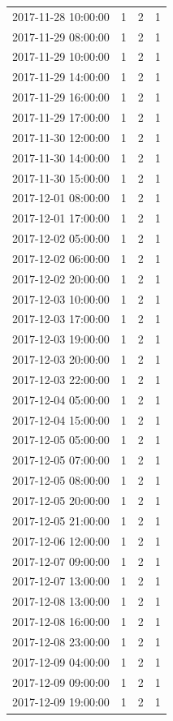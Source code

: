\begin{tabular}{lrrr}
2017-11-28 10:00:00 & 1 & 2 & 1 \\
2017-11-29 08:00:00 & 1 & 2 & 1 \\
2017-11-29 10:00:00 & 1 & 2 & 1 \\
2017-11-29 14:00:00 & 1 & 2 & 1 \\
2017-11-29 16:00:00 & 1 & 2 & 1 \\
2017-11-29 17:00:00 & 1 & 2 & 1 \\
2017-11-30 12:00:00 & 1 & 2 & 1 \\
2017-11-30 14:00:00 & 1 & 2 & 1 \\
2017-11-30 15:00:00 & 1 & 2 & 1 \\
2017-12-01 08:00:00 & 1 & 2 & 1 \\
2017-12-01 17:00:00 & 1 & 2 & 1 \\
2017-12-02 05:00:00 & 1 & 2 & 1 \\
2017-12-02 06:00:00 & 1 & 2 & 1 \\
2017-12-02 20:00:00 & 1 & 2 & 1 \\
2017-12-03 10:00:00 & 1 & 2 & 1 \\
2017-12-03 17:00:00 & 1 & 2 & 1 \\
2017-12-03 19:00:00 & 1 & 2 & 1 \\
2017-12-03 20:00:00 & 1 & 2 & 1 \\
2017-12-03 22:00:00 & 1 & 2 & 1 \\
2017-12-04 05:00:00 & 1 & 2 & 1 \\
2017-12-04 15:00:00 & 1 & 2 & 1 \\
2017-12-05 05:00:00 & 1 & 2 & 1 \\
2017-12-05 07:00:00 & 1 & 2 & 1 \\
2017-12-05 08:00:00 & 1 & 2 & 1 \\
2017-12-05 20:00:00 & 1 & 2 & 1 \\
2017-12-05 21:00:00 & 1 & 2 & 1 \\
2017-12-06 12:00:00 & 1 & 2 & 1 \\
2017-12-07 09:00:00 & 1 & 2 & 1 \\
2017-12-07 13:00:00 & 1 & 2 & 1 \\
2017-12-08 13:00:00 & 1 & 2 & 1 \\
2017-12-08 16:00:00 & 1 & 2 & 1 \\
2017-12-08 23:00:00 & 1 & 2 & 1 \\
2017-12-09 04:00:00 & 1 & 2 & 1 \\
2017-12-09 09:00:00 & 1 & 2 & 1 \\
2017-12-09 19:00:00 & 1 & 2 & 1 \\

\end{tabular}
